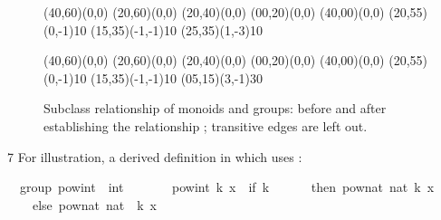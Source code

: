 \begin{isabellebody}
\begin{isamarkuptext}
  \begin{figure}[htbp]
   \begin{center}
     \small
     \unitlength 0.6mm
     \begin{picture}(40,60)(0,0)
       \put(20,60){\makebox(0,0){}}
       \put(20,40){\makebox(0,0){}}
       \put(00,20){\makebox(0,0){}}
       \put(40,00){\makebox(0,0){}}
       \put(20,55){\vector(0,-1){10}}
       \put(15,35){\vector(-1,-1){10}}
       \put(25,35){\vector(1,-3){10}}
     \end{picture}
     \hspace{8em}
     \begin{picture}(40,60)(0,0)
       \put(20,60){\makebox(0,0){}}
       \put(20,40){\makebox(0,0){}}
       \put(00,20){\makebox(0,0){}}
       \put(40,00){\makebox(0,0){}}
       \put(20,55){\vector(0,-1){10}}
       \put(15,35){\vector(-1,-1){10}}
       \put(05,15){\vector(3,-1){30}}
     \end{picture}
     \caption{Subclass relationship of monoids and groups:
        before and after establishing the relationship
        ;  transitive edges are left out.}
     \label{fig:subclass}
   \end{center}
  \end{figure}
7
  For illustration, a derived definition
  in  which uses :%
\end{isamarkuptext}%
\isamarkuptrue%
%
\isadelimquote
%
\endisadelimquote
%
\isatagquote
{}\isamarkupfalse%
\ {\isacharparenleft}\ group{\isacharparenright}\ pow{\isacharunderscore}int\ {\isacharcolon}{\isacharcolon}\ {\isachardoublequoteopen}int\ {\isasymRightarrow}\ {\isasymalpha}\ {\isasymRightarrow}\ {\isasymalpha}{\isachardoublequoteclose}\ \isanewline
\ \ {\isachardoublequoteopen}pow{\isacharunderscore}int\ k\ x\ {\isacharequal}\ {\isacharparenleft}if\ k\ {\isachargreater}{\isacharequal}\ {}\isanewline
\ \ \ \ then\ pow{\isacharunderscore}nat\ {\isacharparenleft}nat\ k{\isacharparenright}\ x\isanewline
\ \ \ \ else\ {\isacharparenleft}pow{\isacharunderscore}nat\ {\isacharparenleft}nat\ {\isacharparenleft}{\isacharminus}\ k{\isacharparenright}{\isacharparenright}\ x{\isacharparenright}{\isasymdiv}{\isacharparenright}{\isachardoublequoteclose}%
\endisatagquote
{\isafoldquote}%
%
\isadelimquote
%
\endisadelimquote
%
\begin{isamarkuptext}%

\end{isamarkuptext}
\end{isabellebody}
